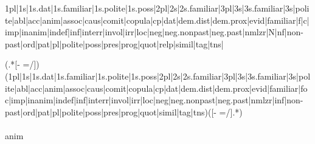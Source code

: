 1pl|1s|1s.dat|1s.familiar|1s.polite|1s.poss|2pl|2s|2s.familiar|3pl|3s|3s.familiar|3s|polite|abl|acc|anim|assoc|caus|comit|copula|cp|dat|dem.dist|dem.prox|evid|familiar|f|c|imp|inanim|indef|inf|interr|invol|irr|loc|neg|neg.nonpast|neg.past|nmlzr|N|nf|non-past|ord|pat|pl|polite|poss|pres|prog|quot|relp|simil|tag|tns|

(.*[- =/])(1pl|1s|1s.dat|1s.familiar|1s.polite|1s.poss|2pl|2s|2s.familiar|3pl|3s|3s.familiar|3s|polite|abl|acc|anim|assoc|caus|comit|copula|cp|dat|dem.dist|dem.prox|evid|familiar|foc|imp|inanim|indef|inf|interr|invol|irr|loc|neg|neg.nonpast|neg.past|nmlzr|inf|non-past|ord|pat|pl|polite|poss|pres|prog|quot|simil|tag|tns)([- =/].*)\\\\

anim
